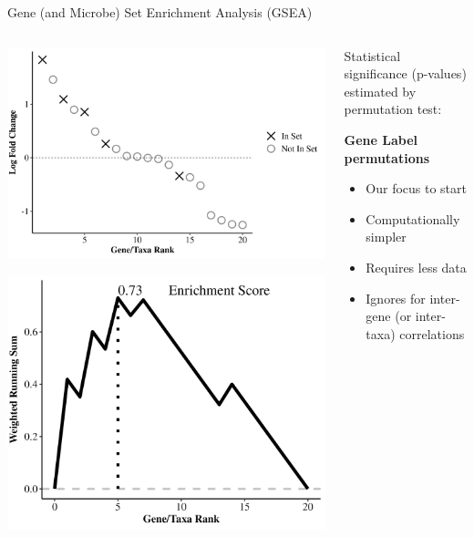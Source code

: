 \documentclass{beamer}
\begin{document}
\begin{frame}[label={sec:org99a194f}]{Gene (and Microbe) Set Enrichment Analysis (GSEA)}
\begin{columns}
\begin{column}{0.5\columnwidth}
\begin{center}
\includegraphics[width=0.85\linewidth]{./images/lfcs_1.png}
\end{center}
\pause
\begin{center}
\includegraphics[width=0.85\linewidth]{./images/lfcs_2.png}
\end{center}
\end{column}
\begin{column}{0.5\columnwidth}
\pause
Statistical significance (p-values) estimated by permutation test:

\vfill

\textbf{Gene Label permutations}
\begin{itemize}
\item Our focus to start
\item Computationally simpler
\item Requires less data
\item Ignores for inter-gene (or inter-taxa) correlations
\end{itemize}


\end{column}
\end{columns}
\end{frame}
\end{document}
